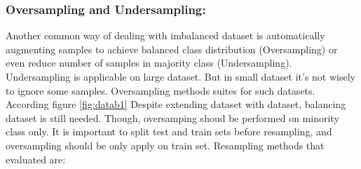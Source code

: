 \subsubsection{\textbf{Oversampling and Undersampling:}}
 Another common way of dealing with imbalanced dataset is automatically augmenting samples to achieve balanced class distribution (Oversampling) or even reduce number of samples in majority class (Undersampling). Undersampling is applicable on large dataset. But in small dataset it's not wisely to ignore some samples. Oversampling methods suites for such datasets. According figure \ref{fig:datab1} Despite extending dataset with \cite{parsfever} dataset, balancing dataset is still needed. Though, oversamping shoud be performed on minority class only. It is important to split test and train sets before resampling, and oversampling should be only apply on train set. Resampling methods that evaluated are: 
